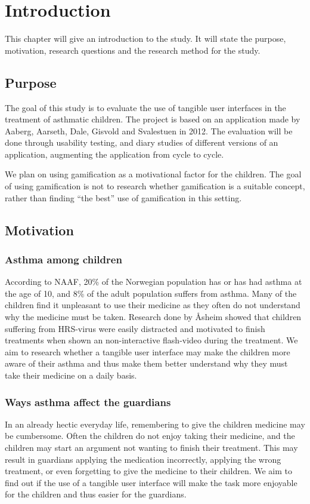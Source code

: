\chapter{Introduction}
\label{chp:introduction}

This chapter will give an introduction to the study. It will state the purpose, motivation, research questions and the research method for the study. 

\section{Purpose}
\label{sec:purpose}
The goal of this study is to evaluate the use of tangible user interfaces in the treatment of asthmatic children. The project is based on an application made by Aaberg, Aarseth, Dale, Gisvold and Svalestuen \cite{CustomerDriven} in 2012.
The evaluation will be done through usability testing, and diary studies of different versions of an application, augmenting the application from cycle to cycle. 

We plan on using gamification as a motivational factor for the children. The goal of using gamification is not to research whether gamification is a suitable concept, rather than finding ``the best'' use of gamification in this setting.


\section{Motivation}
\label{sec:motivation}

\subsection{Asthma among children}
According to NAAF, 20\% \cite{NAAF} of the Norwegian population has or has had asthma at the age of 10, and 8\% of the adult population suffers from asthma. Many of the children find it unpleasant to use their medicine as they often do not understand why the medicine must be taken. Research done by \r{A}sheim \cite{Asheim610877} showed that children suffering from HRS-virus were easily distracted and motivated to finish treatments when shown an non-interactive flash-video during the treatment. We aim to research whether a tangible user interface may make the children more aware of their asthma and thus make them better understand why they must take their medicine on a daily basis. 


\subsection{Ways asthma affect the guardians}
In an already hectic everyday life, remembering to give the children medicine may be cumbersome. Often the children do not enjoy taking their medicine, and the children may start an argument not wanting to finish their treatment. This may result in guardians applying the medication incorrectly, applying the wrong treatment, or even forgetting to give the medicine to their children. We aim to find out if the use of a tangible user interface will make the task more enjoyable for the children and thus easier for the guardians. 


